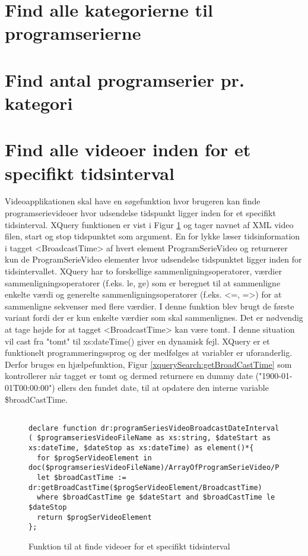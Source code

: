 
\section{Find alle kategorierne til programserierne}




\section{Find antal programserier pr. kategori}




\section{Find alle videoer inden for et specifikt tidsinterval}

Videoapplikationen skal have en søgefunktion hvor brugeren kan finde programserievideoer hvor udsendelse tidspunkt ligger inden for et specifikt tidsinterval. XQuery funktionen er vist i Figur \ref{xquerySearch:programSeriesVideoBroadcastDateInterval} og tager navnet af XML video filen, start og stop tidspunktet som argument. En for lykke læser tidsinformation i tagget <BroadcastTime> af hvert element ProgramSerieVideo og returnerer kun de ProgramSerieVideo elementer hvor udsendelse tidspunktet ligger inden for tidsintervallet. XQuery har to forskellige sammenligningsoperatorer, værdier sammenligningsoperatorer (f.eks. le, ge) som er beregnet til at sammenligne enkelte værdi og generelte sammenligningsoperatorer (f.eks. <=, =>) for at sammenligne sekvenser med flere værdier. I denne funktion blev brugt de første variant fordi der er kun enkelte værdier som skal sammenlignes. Det er nødvendig at tage højde for at tagget <BroadcastTime> kan være tomt. I denne situation vil cast fra "tomt" til xs:dateTime() giver en dynamisk fejl. XQuery er et funktionelt programmeringssprog og der medfølges at variabler er uforanderlig. Derfor bruges en hjælpefunktion, Figur \ref{xquerySearch:getBroadCastTime} som kontrollerer når tagget er tomt og dermed returnere en dummy date ("1900-01-01T00:00:00") ellers den fundet date, til at opdatere den interne variable \$broadCastTime.


\begin{figure}[ht]
\begin{lstlisting}[style=FAKE_XQUERY, language=XQUERY]

declare function dr:programSeriesVideoBroadcastDateInterval
( $programseriesVideoFileName as xs:string, $dateStart as xs:dateTime, $dateStop as xs:dateTime) as element()*{
  for $progSerVideoElement in doc($programseriesVideoFileName)/ArrayOfProgramSerieVideo/ProgramSerieVideo
  let $broadCastTime := dr:getBroadCastTime($progSerVideoElement/BroadcastTime)
  where $broadCastTime ge $dateStart and $broadCastTime le $dateStop
  return $progSerVideoElement
}; 

\end{lstlisting}
\caption{Funktion til at finde videoer for et specifikt tidsinterval}
\label{xquerySearch:programSeriesVideoBroadcastDateInterval}
\end{figure}



